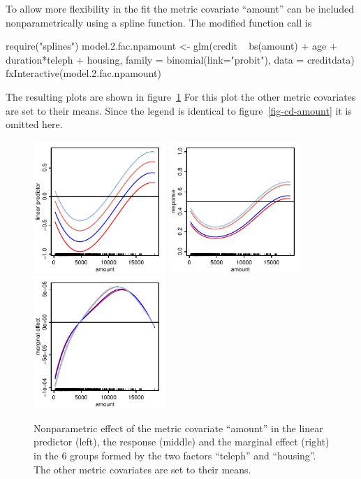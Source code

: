 \documentclass[nojss]{jss}
\newcommand{\quotes}[1]{``#1''}
\begin{document}
To allow more flexibility in the fit the metric covariate \quotes{amount} can  be included nonparametrically using a spline function. The modified function call is
%
\begin{Schunk}
\begin{Sinput}
 require("splines")
 model.2.fac.npamount <- glm(credit ~ bs(amount) + age + duration*teleph  
     + housing, family = binomial(link="probit"), data = creditdata)
 fxInteractive(model.2.fac.npamount) 
\end{Sinput}
\end{Schunk}
%
The resulting plots are shown in figure~\ref{fig-cd-amount-np} For this plot the other metric covariates are set to their means.  Since the legend is identical to figure~\ref{fig-cd-amount} it is omitted here.

\begin{figure}[ht]
\centering
\includegraphics[width=5cm]{cd-amount-np-link} \includegraphics[width=5cm]{cd-amount-np-resp} \includegraphics[width=5cm]{cd-amount-np-marg}
\caption{Nonparametric effect of the metric covariate \quotes{amount} in the linear predictor (left), the response (middle) and the marginal effect (right) in the 6 groups formed by the two factors \quotes{teleph} and \quotes{housing}. The other metric covariates are set to their means.} \label{fig-cd-amount-np}
\end{figure}
\end{document}
